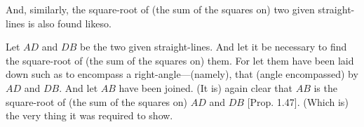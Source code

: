 \begin{Parallel}{}{}
{And, similarly, the square-root of (the sum of the squares on) two given straight-lines
is also found likeso.

Let $AD$ and $DB$ be the two given straight-lines. And let it
be necessary to find the square-root of (the sum of the squares on) them. For let
them have been laid down such as to encompass a right-angle---(namely), that (angle encompassed) by
$AD$ and $DB$. And let $AB$ have been joined. (It is) again clear that $AB$ is the square-root of   (the sum of the squares on) $AD$ and $DB$ [Prop. 1.47]. (Which is) the very thing it was required to show.}
\end{Parallel}


\vspace{7pt}{\footnotesize\noindent$^\dag$ That is, if $\alpha$ and $\beta$ are the lengths of two given straight-lines, with $\alpha$ being greater
than $\beta$, to find a straight-line of length $\gamma$ such that $\alpha^2=\beta^2+\gamma^2$. Similarly, we can also find $\gamma$
such that $\gamma^2=\alpha^2+\beta^2$.}

